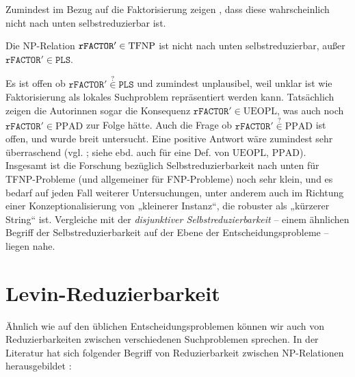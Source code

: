 Zumindest im Bezug auf die Faktorisierung zeigen \citeauthor{harsha_downward_2023}, dass diese wahrscheinlich nicht nach unten selbstreduzierbar ist.
\begin{theorem}
    Die NP-Relation $\mathtt{rFACTOR}'\in\mathrm{TFNP}$ ist nicht nach unten selbstreduzierbar, außer $\mathtt{rFACTOR}'\in\mathtt{PLS}$.
\end{theorem}
Es ist offen ob $\mathtt{rFACTOR}'\stackrel{?}{\in}\mathtt{PLS}$ und zumindest unplausibel, weil unklar ist wie Faktorisierung als lokales Suchproblem repräsentiert werden kann.
Tatsächlich zeigen die Autorinnen sogar die Konsequenz $\mathtt{rFACTOR}'\in\mathrm{UEOPL}$, was auch noch $\mathtt{rFACTOR}'\in\mathrm{PPAD}$ zur Folge hätte. Auch die Frage ob $\mathtt{rFACTOR}'\stackrel{?}{\in}\mathrm{PPAD}$ ist offen, und wurde breit untersucht. Eine positive Antwort wäre zumindest sehr überraschend (vgl. \cite[67:15]{harsha_downward_2023}; siehe ebd. auch für eine Def. von $\mathrm{UEOPL}$, $\mathrm{PPAD}$).
Insgesamt ist die Forschung bezüglich Selbstreduzierbarkeit nach unten für TFNP-Probleme (und allgemeiner für FNP-Probleme) noch sehr klein, und es bedarf auf jeden Fall weiterer Untersuchungen, unter anderem auch im Richtung einer Konzeptionalisierung von „kleinerer Instanz“, die robuster als „kürzerer String“ ist. Vergleiche mit der \emph{disjunktiver Selbstreduzierbarkeit} \parencites[vgl.]{balcazar_self_1989}[vgl.]{selman_natural_1988}[vgl.][Abschn. 9.5]{wechsung_vorlesungen_2000}  -- einem ähnlichen Begriff der Selbstreduzierbarkeit auf der Ebene der Entscheidungsprobleme -- liegen nahe.

\section{Levin-Reduzierbarkeit}

Ähnlich wie auf den üblichen Entscheidungsproblemen können wir auch von Reduzierbarkeiten zwischen verschiedenen Suchproblemen sprechen. In der Literatur hat sich folgender Begriff von Reduzierbarkeit zwischen NP-Relationen herausgebildet \parencites(vgl.)()[229]{papadimitriou_computational_1994}[61]{goldreich_computational_2008}[50]{arora_computational_2009}:

